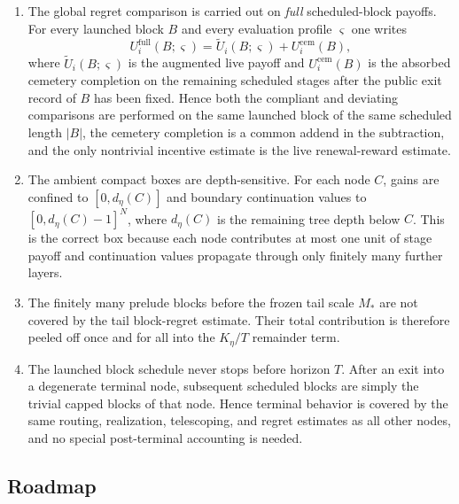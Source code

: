 \documentclass[12pt]{article}
\theoremstyle{definition}
\newcommand{\1}{\mathbf{1}}
\begin{document}
\begin{enumerate}[label=\textnormal{(\arabic*)},leftmargin=2.4em]
restart-bias
\[
\sum_{\xi'}(R_C\beta_C^*)(\xi')h_{i,C}^*(\xi'),
\]
and here it vanishes because every bookkeeping restart returns to the reference
state $\xi_C^\circ$ where $h_{i,C}^*(\xi_C^\circ)=0$.
\item The global regret comparison is carried out on \emph{full}
scheduled-block payoffs. For every launched block $B$ and every evaluation
profile $\varsigma$ one writes
\[
U_i^{\mathrm{full}}(B;\varsigma)
=
\widetilde U_i(B;\varsigma)+U_i^{\mathrm{cem}}(B),
\]
where $\widetilde U_i(B;\varsigma)$ is the augmented live payoff and
$U_i^{\mathrm{cem}}(B)$ is the absorbed cemetery completion on the remaining
scheduled stages after the public exit record of $B$ has been fixed. Hence both
the compliant and deviating comparisons are performed on the same launched block
of the same scheduled length $|B|$, the cemetery completion is a common addend
in the subtraction, and the only nontrivial incentive estimate is the live
renewal-reward estimate.
\item The ambient compact boxes are depth-sensitive. For each node $C$, gains are
confined to $[0,d_\eta(C)]$ and boundary continuation values to
$[0,d_\eta(C)-1]^N$, where $d_\eta(C)$ is the remaining tree depth below $C$.
This is the correct box because each node contributes at most one unit of stage
payoff and continuation values propagate through only finitely many further
layers.
\item The finitely many prelude blocks before the frozen tail scale $M_*$ are not
covered by the tail block-regret estimate. Their total contribution is therefore
peeled off once and for all into the $K_\eta/T$ remainder term.
\item The launched block schedule never stops before horizon $T$. After an exit
into a degenerate terminal node, subsequent scheduled blocks are simply the
trivial capped blocks of that node. Hence terminal behavior is covered by the
same routing, realization, telescoping, and regret estimates as all other
nodes, and no special post-terminal accounting is needed.
\end{enumerate}

\subsection{Roadmap}
\end{document}
